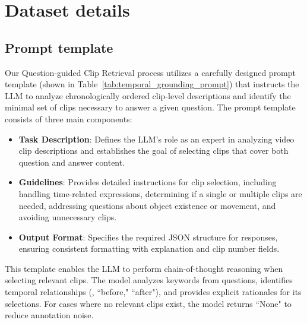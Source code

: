 \section{Dataset details}
\subsection{Prompt template}
Our Question-guided Clip Retrieval process utilizes a carefully designed prompt template (shown in Table~\ref{tab:temporal_grounding_prompt}) that instructs the LLM to analyze chronologically ordered clip-level descriptions and identify the minimal set of clips necessary to answer a given question.
The prompt template consists of three main components:

\begin{itemize}[leftmargin=6mm]
    \item \textbf{Task Description}: Defines the LLM's role as an expert in analyzing video clip descriptions and establishes the goal of selecting clips that cover both question and answer content.
    \item \textbf{Guidelines}: Provides detailed instructions for clip selection, including handling time-related expressions, determining if a single or multiple clips are needed, addressing questions about object existence or movement, and avoiding unnecessary clips.
    \item \textbf{Output Format}: Specifies the required JSON structure for responses, ensuring consistent formatting with explanation and clip number fields.
\end{itemize}

This template enables the LLM to perform chain-of-thought reasoning when selecting relevant clips. The model analyzes keywords from questions, identifies temporal relationships (\eg, ``before," ``after"), and provides explicit rationales for its selections. For cases where no relevant clips exist, the model returns ``None" to reduce annotation noise.

